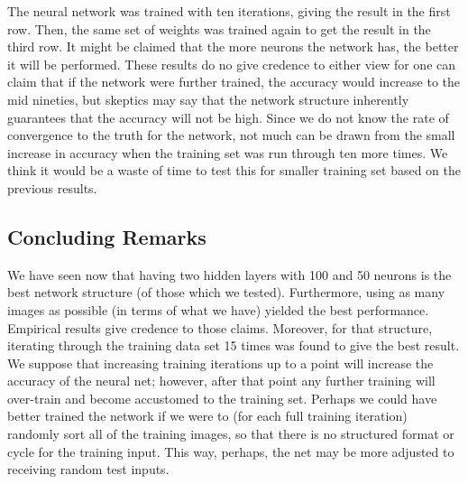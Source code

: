\documentclass[12pt]{article}
\begin{document}
The neural network was trained with ten iterations, giving the result in the first row.
Then, the same set of weights was trained again to get the result in the third row.
It might be claimed that the more neurons the network has, the better it will be performed.
These results do no give credence to either view for one can claim that if the network were further trained, the accuracy would increase to the mid nineties, but skeptics may say that the network structure inherently guarantees that the accuracy will not be high.
Since we do not know the rate of convergence to the truth for the network, not much can be drawn from the small increase in accuracy when the training set was run through ten more times.  
We think it would be a waste of time to test this for smaller training set based on the previous results.

\subsection*{Concluding Remarks}

We have seen now that having two hidden layers with 100 and 50 neurons is the best network structure (of those which we tested).
Furthermore, using as many images as possible (in terms of what we have) yielded the best performance.
Empirical results give credence to those claims.
Moreover, for that structure, iterating through the training data set 15 times was found to give the best result. We suppose that increasing training iterations up to a point will increase the accuracy of the neural net; however, after that point any further training will over-train and become accustomed to the training set. Perhaps we could have better trained the network if we were to (for each full training iteration) randomly sort all of the training images, so that there is no structured format or cycle for the training input. This way, perhaps, the net may be more adjusted to receiving random test inputs.
\end{document}
